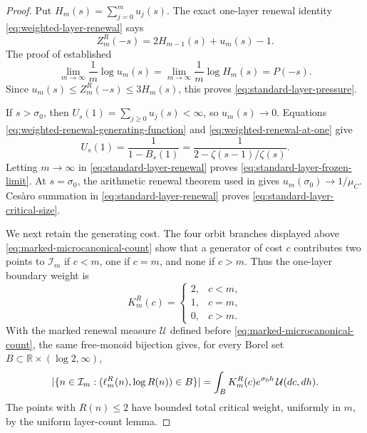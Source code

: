 \begin{proof}
Put \(H_m(s)=\sum_{j=0}^m u_j(s)\).  The exact one-layer renewal identity
\eqref{eq:weighted-layer-renewal} says
\begin{equation}
 Z_m^R(-s)=2H_{m-1}(s)+u_m(s)-1.
 \label{eq:standard-layer-renewal}
\end{equation}
The proof of  established
\[
 \lim_{m\to\infty}\frac1m\log u_m(s)
 =\lim_{m\to\infty}\frac1m\log H_m(s)
 =P(-s).
\]
Since \(u_m(s)\le Z_m^R(-s)\le3H_m(s)\), this proves
\eqref{eq:standard-layer-pressure}.

If \(s>\sigma_0\), then \(U_s(1)=\sum_{j\ge0}u_j(s)<\infty\), so
\(u_m(s)\to0\).  Equations
\eqref{eq:weighted-renewal-generating-function} and
\eqref{eq:weighted-renewal-at-one} give
\[
 U_s(1)=\frac1{1-B_s(1)}
 =\frac1{2-\zeta(s-1)/\zeta(s)}.
\]
Letting \(m\to\infty\) in \eqref{eq:standard-layer-renewal} proves
\eqref{eq:standard-layer-frozen-limit}.  At \(s=\sigma_0\), the arithmetic
renewal theorem used in  gives
\(u_m(\sigma_0)\to1/\mu_C\).  Ces\`aro summation in
\eqref{eq:standard-layer-renewal} proves
\eqref{eq:standard-layer-critical-size}.

We next retain the generating cost.  The four orbit branches displayed above
\eqref{eq:marked-microcanonical-count} show that a generator of cost \(c\)
contributes two points to \(\mathcal I_m\) if \(c<m\), one if \(c=m\), and
none if \(c>m\).  Thus the one-layer boundary weight is
\[
 K_m^R(c)=
 \begin{cases}
  2,&c<m,\\
  1,&c=m,\\
  0,&c>m.
 \end{cases}
\]
With the marked renewal measure \(\mathcal U\) defined before
\eqref{eq:marked-microcanonical-count}, the same free-monoid bijection gives,
for every Borel set
\(B\subset\mathbb R\times(\log2,\infty)\),
\begin{equation}
 \lvert \{n\in\mathcal I_m:
   (\ell_m^R(n),\log R(n))\in B\} \rvert
 =\int_B K_m^R(c)e^{\sigma_0h}\,\mathcal U(dc,dh).
 \label{eq:standard-layer-marked-count}
\end{equation}
The points with \(R(n)\le2\) have bounded total critical weight, uniformly in
\(m\), by the uniform layer-count lemma.


\end{proof}
